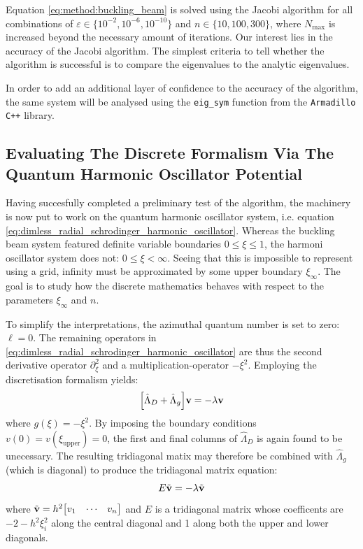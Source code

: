 \documentclass[reprint,english]{revtex4-1}
\begin{document}
Equation \eqref{eq:method:buckling_beam} is solved using the Jacobi algorithm for all combinations of \(\varepsilon\in\{10^{-2},10^{-6},10^{-10}\}\) and \(n\in\{10,100,300\}\), where \(N_\text{max}\) is increased beyond the necessary amount of iterations. Our interest lies in the accuracy of the Jacobi algorithm. The simplest criteria to tell whether the algorithm is successful is to compare the eigenvalues to the analytic eigenvalues.

In order to add an additional layer of confidence to the accuracy of the algorithm, the same system will be analysed using the \texttt{eig\_sym} function from the \texttt{Armadillo C++} library.
\subsection{Evaluating The Discrete Formalism Via The Quantum Harmonic Oscillator Potential}
Having succesfully completed a preliminary test of the algorithm, the machinery is now put to work on the quantum harmonic oscillator system, i.e. equation \eqref{eq:dimless_radial_schrodinger_harmonic_oscillator}. Whereas the buckling beam system featured definite variable boundaries \(0\leq\xi\leq1\), the harmoni oscillator system does not: \(0\leq\xi<\infty\). Seeing that this is impossible to represent using a grid, infinity must be approximated by some upper boundary \(\xi_\infty\). The goal is to study how the discrete mathematics behaves with respect to the parameters \(\xi_\infty\) and \(n\). 

To simplify the interpretations, the azimuthal quantum number is set to zero: \(\ell=0\). The remaining operators in \eqref{eq:dimless_radial_schrodinger_harmonic_oscillator} are thus the second derivative operator \(\partial_\xi^2\) and a multiplication-operator \(-\xi^2\). Employing the discretisation formalism yields:
\begin{equation}\label{eq:discrete_dimless_harmonic_oscillator}
\Big[\hat{\Lambda}_D+\hat{\Lambda}_g\Big]\vb{v}=-\lambda\vb{v}
\end{equation}
where \(g(\xi)=-\xi^2\). By imposing the boundary conditions \(v(0)=v(\xi_\text{upper})=0\), the first and final columns of \(\hat{\Lambda}_D\) is again found to be unecessary. The resulting tridiagonal matix may therefore be combined with \(\hat{\Lambda}_g\) (which is diagonal) to produce the tridiagonal matrix equation:
\begin{equation}\label{eq:method:quantum_harmonic_oscillator}
E\tilde{\vb{v}}=-\lambda\tilde{\vb{v}}
\end{equation}
where \(\tilde{\vb{v}}=h^2\mqty[v_1&\cdots&v_n]\) and \(E\) is a tridiagonal matrix whose coefficents are \(-2-h^2\xi_i^2\) along the central diagonal and 1 along both the upper and lower diagonals.
\end{document}
